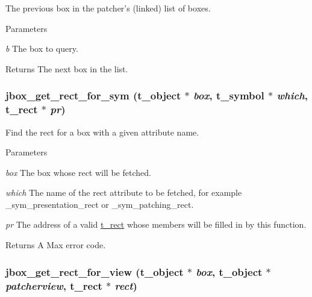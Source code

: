The previous box in the patcher's (linked) list of boxes. 
\begin{DoxyParams}{Parameters}
\item[{\em b}]The box to query. \end{DoxyParams}
\begin{DoxyReturn}{Returns}
The next box in the list. 
\end{DoxyReturn}
\hypertarget{group__jbox_ga92dedcbda2a2dbbab47e0801902c56b4}{
\subsubsection[{jbox\_\-get\_\-rect\_\-for\_\-sym}]{ jbox\_\-get\_\-rect\_\-for\_\-sym ({\bf t\_\-object} $\ast$ {\em box}, \/  {\bf t\_\-symbol} $\ast$ {\em which}, \/  {\bf t\_\-rect} $\ast$ {\em pr})}}
\label{group__jbox_ga92dedcbda2a2dbbab47e0801902c56b4}


Find the rect for a box with a given attribute name. 
\begin{DoxyParams}{Parameters}
\item[{\em box}]The box whose rect will be fetched. \item[{\em which}]The name of the rect attribute to be fetched, for example {\ttfamily \_\-sym\_\-presentation\_\-rect} or {\ttfamily \_\-sym\_\-patching\_\-rect}. \item[{\em pr}]The address of a valid \hyperlink{structt__rect}{t\_\-rect} whose members will be filled in by this function. \end{DoxyParams}
\begin{DoxyReturn}{Returns}
A Max error code. 
\end{DoxyReturn}
\hypertarget{group__jbox_gab47a7fa918c470f60f0789baafaa7b4b}{
\subsubsection[{jbox\_\-get\_\-rect\_\-for\_\-view}]{ jbox\_\-get\_\-rect\_\-for\_\-view ({\bf t\_\-object} $\ast$ {\em box}, \/  {\bf t\_\-object} $\ast$ {\em patcherview}, \/  {\bf t\_\-rect} $\ast$ {\em rect})}}
\label{group__jbox_gab47a7fa918c470f60f0789baafaa7b4b}


